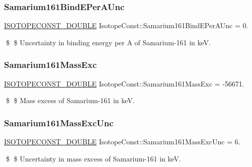 \subsubsection{\texorpdfstring{Samarium161\+Bind\+E\+Per\+A\+Unc}{Samarium161BindEPerAUnc}}
{\footnotesize\ttfamily \mbox{\hyperlink{group___isotope_const-_macros_ga8f45a7272ce02c0b4c65c44636ed719a}{I\+S\+O\+T\+O\+P\+E\+C\+O\+N\+S\+T\+\_\+\+D\+O\+U\+B\+LE}} Isotope\+Const\+::\+Samarium161\+Bind\+E\+Per\+A\+Unc = 0.}

\$ \$ Uncertainty in binding energy per A of Samarium-\/161 in keV. \mbox{\label{group___isotope_const-_samarium-_sm161_gac309877c0df803279b41618b68e06bb4}} 
\subsubsection{\texorpdfstring{Samarium161\+Mass\+Exc}{Samarium161MassExc}}
{\footnotesize\ttfamily \mbox{\hyperlink{group___isotope_const-_macros_ga8f45a7272ce02c0b4c65c44636ed719a}{I\+S\+O\+T\+O\+P\+E\+C\+O\+N\+S\+T\+\_\+\+D\+O\+U\+B\+LE}} Isotope\+Const\+::\+Samarium161\+Mass\+Exc = -\/56671.}

\$ \$ Mass excess of Samarium-\/161 in keV. \mbox{\label{group___isotope_const-_samarium-_sm161_ga17ae8018d634463c8ee5ebf89263de36}} 
\subsubsection{\texorpdfstring{Samarium161\+Mass\+Exc\+Unc}{Samarium161MassExcUnc}}
{\footnotesize\ttfamily \mbox{\hyperlink{group___isotope_const-_macros_ga8f45a7272ce02c0b4c65c44636ed719a}{I\+S\+O\+T\+O\+P\+E\+C\+O\+N\+S\+T\+\_\+\+D\+O\+U\+B\+LE}} Isotope\+Const\+::\+Samarium161\+Mass\+Exc\+Unc = 6.}

\$ \$ Uncertainty in mass excess of Samarium-\/161 in keV. \mbox{\label{group___isotope_const-_samarium-_sm161_ga9317ea135b1522310bd652e60e09d0ab}} 

